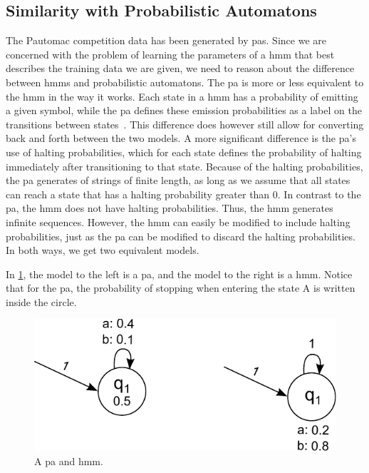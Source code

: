 \subsection{Similarity with Probabilistic Automatons}
The Pautomac competition data has been generated by \gls{pa}s. Since we are concerned with the problem of learning the parameters of a \gls{hmm} that best describes the training data we are given, we need to reason about the difference between \gls{hmm}s and probabilistic automatons. The \gls{pa} is more or less equivalent to the \gls{hmm} in the way it works. Each state in a \gls{hmm} has a probability of emitting a given symbol, while the \gls{pa} defines these emission probabilities as a label on the transitions between states~\cite{pautomacTR}. This difference does however still allow for converting back and forth between the two models.
A more significant difference is the \gls{pa}'s use of halting probabilities, which for each state defines the probability of halting immediately after transitioning to that state. Because of the halting probabilities, the \gls{pa} generates of strings of finite length, as long as we assume that all states can reach a state that has a halting probability greater than 0. In contrast to the \gls{pa}, the \gls{hmm} does not have halting probabilities. Thus, the \gls{hmm} generates infinite sequences. However, the \gls{hmm} can easily be modified to include halting probabilities, just as the \gls{pa} can be modified to discard the halting probabilities. In both ways, we get two equivalent models.

In \ref{fig:model-with-and-without-stop-symbols}, the model to the left is a \gls{pa}, and the model to the right is a \gls{hmm}.
Notice that for the \gls{pa}, the probability of stopping when entering the state A is written inside the circle.

\begin{figure}
\begin{centering}
\includegraphics[scale=1]{./pictures/model-with-and-without-stop-symbols.pdf}
\caption{A \gls{pa} and \gls{hmm}.}
\label{fig:model-with-and-without-stop-symbols}
\end{centering}
\end{figure}

